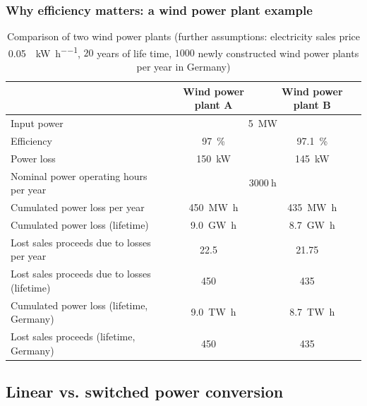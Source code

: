 \begin{frame}[c]
	\frametitle{Why efficiency matters: a wind power plant example}
	\begin{table}
		\centering
		\begin{tabular}{lcc}
			\toprule
			& Wind power plant A & Wind power plant B \\
			\midrule
			Input power & \multicolumn{2}{c}{\SI{5}{\mega\watt}} \\
			Efficiency & \SI{97}{\percent} & \SI{97.1}{\percent}  \\
			Power loss & \SI{150}{\kilo\watt} & \SI{145}{\kilo\watt}\\
			\midrule
			Nominal power operating hours per year & \multicolumn{2}{c}{$\SI{3000}{\hour}$} \\
			Cumulated power loss per year & \SI{450}{\mega\watt\hour} & \SI{435}{\mega\watt\hour} \\
			Cumulated power loss (lifetime) & \SI{9.0}{\giga\watt\hour} & \SI{8.7}{\giga\watt\hour} \\
			\midrule
			Lost sales proceeds due to losses per year  & \SI{22.5}{\kilo\EUR} & \SI{21.75}{\kilo\EUR} \\
			Lost sales proceeds due to losses (lifetime)  & \SI{450}{\kilo\EUR} & \SI{435}{\kilo\EUR} \\
			\midrule
			Cumulated power loss (lifetime, Germany)  & \SI{9.0}{\tera\watt\hour} & \SI{8.7}{\tera\watt\hour} \\
			Lost sales proceeds (lifetime, Germany)  & \SI{450}{\mega\EUR} & \SI{435}{\mega\EUR} \\
			\bottomrule
		\end{tabular}
		\label{tab:efficiency_wind_power_example}
		\caption{Comparison of two wind power plants (further assumptions:  electricity sales price \SI[fraction-function=\nicefrac]{0.05}{\EUR\per\kilo\watt\per\hour}, $20$ years of life time, $\num{1000}$ newly constructed wind power plants per year in Germany)}
	\end{table}
\end{frame}

\subsection{Linear vs. switched power conversion}

